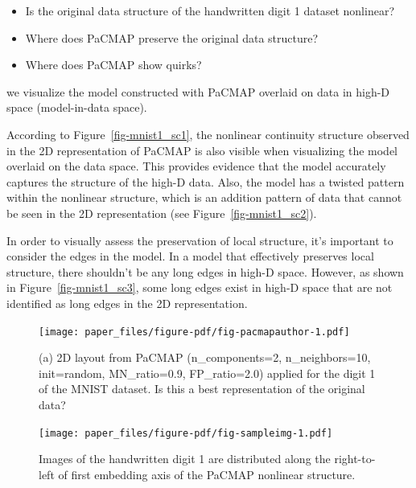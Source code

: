 \documentclass[
  12pt]{article}
\providecommand{\tightlist}{%
  \setlength{\itemsep}{0pt}\setlength{\parskip}{0pt}}\usepackage{longtable,booktabs,array}
\begin{document}
\begin{itemize}
\tightlist
\item
  Is the original data structure of the handwritten digit 1 dataset
  nonlinear?
\item
  Where does PaCMAP preserve the original data structure?
\item
  Where does PaCMAP show quirks?
\end{itemize}

we visualize the model constructed with PaCMAP overlaid on data in
high-D space (model-in-data space).

According to Figure~\ref{fig-mnist1_sc1}, the nonlinear continuity
structure observed in the 2D representation of PaCMAP is also visible
when visualizing the model overlaid on the data space. This provides
evidence that the model accurately captures the structure of the high-D
data. Also, the model has a twisted pattern within the nonlinear
structure, which is an addition pattern of data that cannot be seen in
the 2D representation (see Figure~\ref{fig-mnist1_sc2}).

In order to visually assess the preservation of local structure, it's
important to consider the edges in the model. In a model that
effectively preserves local structure, there shouldn't be any long edges
in high-D space. However, as shown in Figure~\ref{fig-mnist1_sc3}, some
long edges exist in high-D space that are not identified as long edges
in the 2D representation.

\begin{figure}[H]

{\centering \texttt{[image: paper\_files/figure-pdf/fig-pacmapauthor-1.pdf]}

}

\caption{\label{fig-pacmapauthor}(a) 2D layout from PaCMAP
(n\_components=2, n\_neighbors=10, init=random, MN\_ratio=0.9,
FP\_ratio=2.0) applied for the digit 1 of the MNIST dataset. Is this a
best representation of the original data?}

\end{figure}

\begin{figure}[H]

{\centering \texttt{[image: paper\_files/figure-pdf/fig-sampleimg-1.pdf]}

}

\caption{\label{fig-sampleimg}Images of the handwritten digit 1 are
distributed along the right-to-left of first embedding axis of the
PaCMAP nonlinear structure.}

\end{figure}
\end{document}
